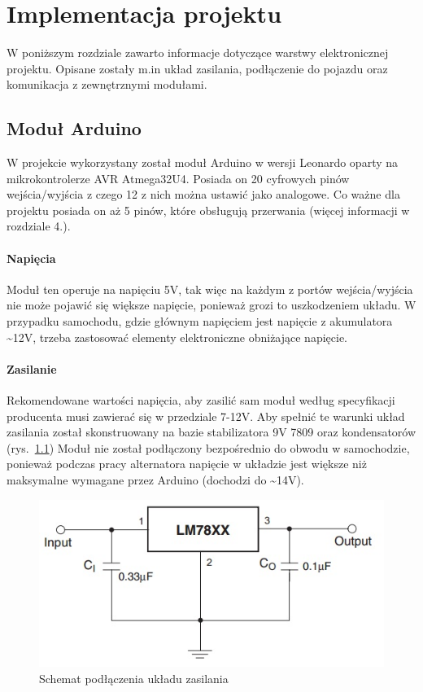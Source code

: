 \chapter{Implementacja projektu}
W poniższym rozdziale zawarto informacje dotyczące warstwy elektronicznej projektu. Opisane zostały m.in układ zasilania, podłączenie do pojazdu oraz komunikacja z zewnętrznymi modułami.
\section{Moduł Arduino}
W projekcie wykorzystany został moduł Arduino w wersji Leonardo oparty na mikrokontrolerze AVR Atmega32U4. Posiada on 20 cyfrowych pinów wejścia/wyjścia z czego 12 z nich można ustawić jako analogowe. Co ważne dla projektu posiada on aż 5 pinów, które obsługują przerwania (więcej informacji w rozdziale 4.).
\subsubsection{Napięcia}
Moduł ten operuje na napięciu 5V, tak więc na każdym z portów wejścia/wyjścia nie może pojawić się większe napięcie, ponieważ grozi to uszkodzeniem układu. W przypadku samochodu, gdzie głównym napięciem jest napięcie z akumulatora \textasciitilde12V, trzeba zastosować elementy elektroniczne obniżające napięcie.
\subsubsection{Zasilanie}
Rekomendowane wartości napięcia, aby zasilić sam moduł według specyfikacji producenta musi zawierać się w przedziale 7-12V. Aby spełnić te warunki układ zasilania został skonstruowany na bazie stabilizatora 9V 7809 oraz kondensatorów (rys.~\ref{fig:LM78XX}) Moduł nie został podłączony bezpośrednio do obwodu w samochodzie, ponieważ podczas pracy alternatora napięcie w układzie jest większe niż maksymalne wymagane przez Arduino (dochodzi do \textasciitilde14V).

\begin{figure}[!htb]
\centering
\includegraphics[width=0.7\linewidth]{Rysunki/78xx.jpg}
\caption{Schemat podłączenia układu zasilania \cite{LM78XX}}
\label{fig:LM78XX}
\end{figure}

